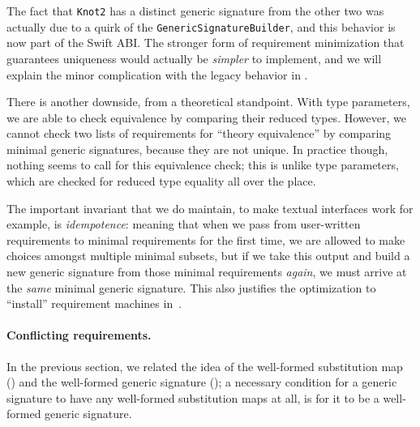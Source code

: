 \documentclass[../generics]{subfiles}
\begin{document}
The fact that \texttt{Knot2} has a distinct generic signature from the other two was actually due to a quirk of the \texttt{GenericSignatureBuilder}, and this behavior is now part of the Swift ABI. The stronger form of requirement minimization that guarantees uniqueness would actually be \emph{simpler} to implement, and we will explain the minor complication with the legacy behavior in .

There is another downside, from a theoretical standpoint. With type parameters, we are able to check equivalence by comparing their reduced types. However, we cannot check two lists of requirements for ``theory equivalence'' by comparing minimal generic signatures, because they are not unique. In practice though, nothing seems to call for this equivalence check; this is unlike type parameters, which are checked for reduced type equality all over the place.

The important invariant that we do maintain, to make textual interfaces work for example, is \emph{idempotence}: meaning that when we pass from user-written requirements to minimal requirements for the first time, we are allowed to make choices amongst multiple minimal subsets, but if we take this output and build a new generic signature from those minimal requirements \emph{again}, we must arrive at the \emph{same} minimal generic signature. This also justifies the optimization to ``install'' requirement machines in~.

\paragraph{Conflicting requirements.} In the previous section, we related the idea of the well-formed substitution map () and the well-formed generic signature (); a necessary condition for a generic signature to have any well-formed substitution maps at all, is for it to be a well-formed generic signature.
\end{document}
